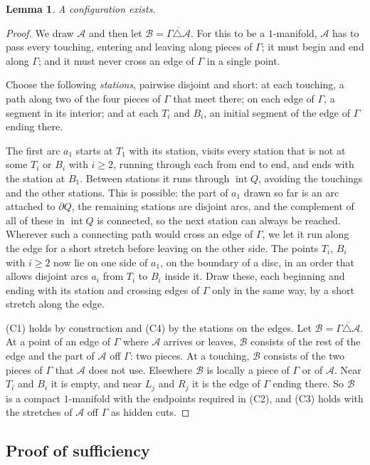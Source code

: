 \documentclass[11pt,a4paper]{article}
\newtheorem{lemma}[theorem]{Lemma}
\theoremstyle{definition}
\theoremstyle{remark}
\newcommand{\A}{\mathcal{A}}
\newcommand{\B}{\mathcal{B}}
\newcommand{\intr}{\operatorname{int}}
\newcommand{\bd}{\partial}
\begin{document}
\begin{lemma}\label{lem:start}
A configuration exists.
\end{lemma}
\begin{proof}
We draw $\A$ and then let $\B=\overline{\Gamma\triangle\A}$. For this to be
a $1$-manifold, $\A$ has to pass every touching, entering and leaving
along pieces of $\Gamma$; it must begin and end along $\Gamma$; and it must
never cross an edge of $\Gamma$ in a single point.

Choose the following \emph{stations}, pairwise disjoint and short: at each
touching, a path along two of the four pieces of $\Gamma$ that meet there;
on each edge of $\Gamma$, a segment in its interior; and at each $T_i$ and
$B_i$, an initial segment of the edge of $\Gamma$ ending there.

The first arc $a_1$ starts at $T_1$ with its station, visits every station
that is not at some $T_i$ or $B_i$ with $i\ge2$, running through each from
end to end, and ends with the station at $B_1$. Between stations it runs through $\intr Q$, avoiding the touchings and
the other stations. This is possible: the part of $a_1$ drawn so far is an
arc attached to $\bd Q$, the remaining stations are disjoint arcs, and the
complement of all of these in $\intr Q$ is connected, so the next station
can always be reached. Wherever such a connecting path would cross an edge
of $\Gamma$, we let it run along the edge for a short stretch before
leaving on the other side. The points $T_i$, $B_i$ with $i\ge2$ now lie on
one side of $a_1$, on the boundary of a disc, in an order that allows
disjoint arcs $a_i$ from $T_i$ to $B_i$ inside it. Draw these, each
beginning and ending with its station and crossing edges of $\Gamma$ only
in the same way, by a short stretch along the edge.

(C1) holds by construction and (C4) by the stations on the edges. Let
$\B=\overline{\Gamma\triangle\A}$. At a point of an edge of $\Gamma$ where
$\A$ arrives or leaves, $\B$ consists of the rest of the edge and the part
of $\A$ off $\Gamma$: two pieces. At a touching, $\B$ consists of the two
pieces of $\Gamma$ that $\A$ does not use. Elsewhere $\B$ is locally a
piece of $\Gamma$ or of $\A$. Near $T_i$ and $B_i$ it is empty, and near
$L_j$ and $R_j$ it is the edge of $\Gamma$ ending there. So $\B$ is a
compact $1$-manifold with the endpoints required in (C2), and (C3) holds
with the stretches of $\A$ off $\Gamma$ as hidden cuts.
\end{proof}

\subsection{Proof of sufficiency}
\end{document}
